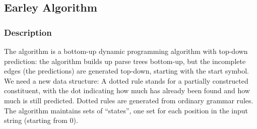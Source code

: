 \documentclass{article}
\begin{document}
\subsection{Earley Algorithm}
\subsubsection{ Description}
The algorithm is a bottom-up dynamic programming algorithm with top-down prediction: the algorithm builds up parse trees
bottom-up, but the incomplete edges (the predictions) are generated top-down, starting with the start symbol.
We need a new data structure: A dotted rule stands for a partially constructed constituent, with the dot indicating 
how much has already been found and how much is still predicted.
Dotted rules are generated from ordinary grammar rules.
The algorithm maintains sets of “states”, one set for each
position in the input string (starting from 0).
\end{document}
